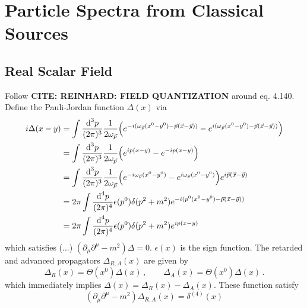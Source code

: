 \section{Particle Spectra from Classical Sources}

\subsection{Real Scalar Field}

Follow \textbf{CITE: REINHARD: FIELD QUANTIZATION} around eq. 4.140. Define the Pauli-Jordan function $\Delta(x)$ via
\begin{align}
    {i}\Delta(x-y)&=\int\frac{\text{d}^3p}{(2\pi)^3}\frac{1}{2\omega_{\vec{p}}}\Big(e^{-{i} (\omega_{\vec{p}}(x^0-y^0)-\vec{p}(\vec{x}-\vec{y}))}-e^{{i} (\omega_{\vec{p}}(x^0-y^0)-\vec{p}(\vec{x}-\vec{y}))}\Big)\\
    &=\int\frac{\text{d}^3p}{(2\pi)^3}\frac{1}{2\omega_{\vec{p}}}\Big(e^{{i} p(x-y)}-e^{-{i} p(x-y)}\Big)\\
    &=\int\frac{\text{d}^3p}{(2\pi)^3}\frac{1}{2\omega_{\vec{p}}}\Big(e^{-{i} \omega_{\vec{p}}(x^0-y^0)}-e^{{i} \omega_{\vec{p}}(x^0-y^0)}\Big)e^{{i}\vec{p}(\vec{x}-\vec{y})}\\
    &=2\pi\int\frac{\text{d}^4p}{(2\pi)^4}\epsilon(p^0)\delta(p^2+m^2)e^{-{i}(p^0(x^0-y^0)-\vec{p}(\vec{x}-\vec{y}))}\\
    &=2\pi\int\frac{\text{d}^4p}{(2\pi)^4}\epsilon(p^0)\delta(p^2+m^2)e^{{i} p(x-y)}
\end{align}
which satisfies (...) $(\partial_\mu\partial^\mu-m^2)\Delta=0$. $\epsilon(x)$ is the sign function. The retarded and advanced propagators $\Delta_{R,A}(x)$ are given by 
\begin{equation}
    \Delta_R(x)=\Theta(x^0)\Delta(x)\,,\qquad\Delta_A(x)=\Theta(x^0)\Delta(x)\,.
\end{equation}
which immediately implies $\Delta(x)=\Delta_R(x)-\Delta_A(x)$. These function satisfy
\begin{equation}
    (\partial_\mu\partial^\mu-m^2)\Delta_{R,A}(x)=\delta^{(4)}(x)
\end{equation}


